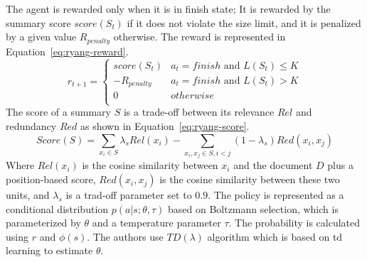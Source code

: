 The agent is rewarded only when it is in finish state; It is rewarded by the summary score $ score(S_t) $ if it does not violate the size limit, and it is penalized by a given value $ R_{penalty} $ otherwise.
The reward is represented in Equation~\ref{eq:ryang-reward}.
\begin{equation}
\label{eq:ryang-reward}
r_{t+1} = \left\lbrace 
\begin{array}{ll}
score(S_t) & a_t = finish \text{ and } L(S_t) \le K \\
- R_{penalty} & a_t = finish \text{ and } L(S_t) > K \\
0 & otherwise \\
\end{array}
\right. 
\end{equation}
The score of a summary $ S $ is a trade-off between its relevance $ Rel $ and redundancy $ Red $ as shown in Equation~\ref{eq:ryang-score}. 
\begin{equation}
\label{eq:ryang-score}
Score(S) = \sum\limits_{x_i \in S} \lambda_s Rel(x_i) - \sum\limits_{x_i, x_j \in S, i < j} (1 - \lambda_s) Red(x_i, x_j)
\end{equation}
Where $ Rel(x_i) $ is the cosine similarity between $ x_i $ and the document $ D $ plus a position-based score, $ Red(x_i, x_j) $ is the cosine similarity between these two units, and $ \lambda_s $ is a trad-off parameter set to $ 0.9 $. 
The policy is represented as a conditional distribution $ p(a|s;\theta,\tau) $ based on Boltzmann selection, which is parameterized by $ \theta $ and a temperature parameter $ \tau $.
The probability is calculated using $ r $ and $ \phi(s) $.
The authors use $ TD(\lambda) $ algorithm which is based on \ac{td} learning to estimate $ \theta $.


